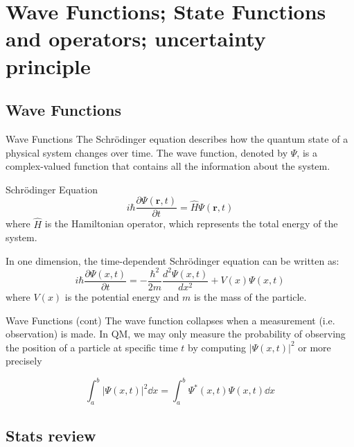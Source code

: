 
\section[Wave Functions]{Wave Functions; State Functions and operators; uncertainty principle}
\subsection{Wave Functions}

\begin{frame}{Wave Functions}
	The Schrödinger equation describes how the quantum state of a physical system changes over time. The wave function, denoted by $\Psi$, is a complex-valued function that contains all the information about the system.

	\begin{block}{Schrödinger Equation}
		\begin{equation*}
			i\hbar \frac{\partial \Psi(\mathbf{r}, t)}{\partial t} = \hat{H} \Psi(\mathbf{r}, t)
		\end{equation*}
		where $\hat{H}$ is the Hamiltonian operator, which represents the total energy of the system.

		In one dimension, the time-dependent Schrödinger equation can be written as:
		\begin{equation*}
			i\hbar \frac{\partial \Psi(x, t)}{\partial t} = -\frac{\hbar^2}{2m} \frac{d^2 \Psi(x, t)}{dx^2} + V(x) \Psi(x, t)
		\end{equation*}
		where $V(x)$ is the potential energy and $m$ is the mass of the particle.

	\end{block}

\end{frame}

\begin{frame}{Wave Functions (cont)}
	The wave function collapses when a measurement (i.e. observation) is made.
	In QM, we may only measure the probability of observing the position of a particle at specific time $t$ by computing $|\Psi(x,t)|^2$ or more precisely
	\begin{block}

		\[
			\int_a^b |\Psi(x,t)|^2 \dd{x} = \int_a^b \Psi^*(x,t) \Psi(x,t) \dd{x}
		\]

	\end{block}
\end{frame}

\subsection{Stats review}

